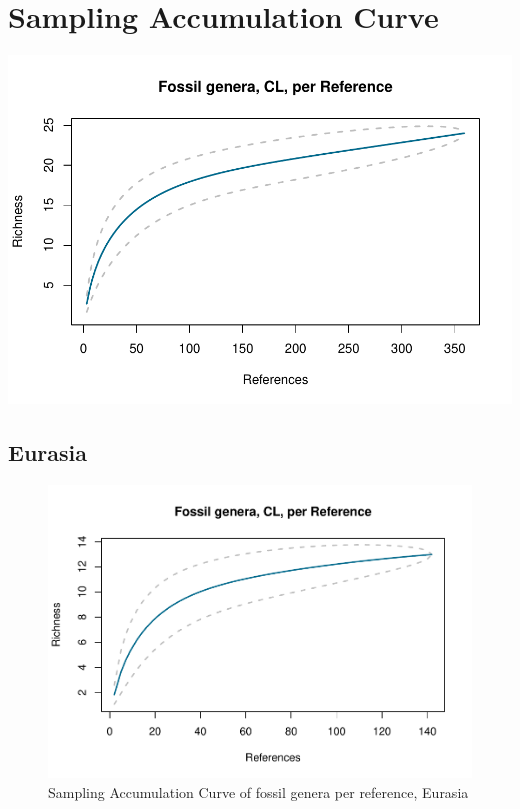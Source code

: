\documentclass[]{article}
\begin{document}
\newpage

\section{Sampling Accumulation Curve}\label{sampling-accumulation-curve}

\includegraphics{MA_JJ_files/figure-latex/Species Accumulation Curve with Genera-1.pdf}
\newpage

\subsection{Eurasia}\label{eurasia}

\begin{figure}[htbp]
\centering
\includegraphics{MA_JJ_files/figure-latex/Species Accumulation Curve with Genera, Eurasia-1.pdf}
\caption{Sampling Accumulation Curve of fossil genera per reference,
Eurasia}
\end{figure}
\end{document}
